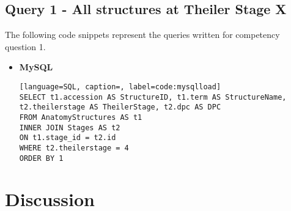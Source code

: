 \subsection*{Query 1 - All structures at Theiler Stage X}\label{query1}

The following code snippets represent the queries written for competency question 1.
\begin{itemize}
\item \textbf{MySQL}
\begin{lstlisting}[language=SQL, caption=, label=code:mysqlload]
SELECT t1.accession AS StructureID, t1.term AS StructureName, t2.theilerstage AS TheilerStage, t2.dpc AS DPC
FROM AnatomyStructures AS t1
INNER JOIN Stages AS t2
ON t1.stage_id = t2.id
WHERE t2.theilerstage = 4
ORDER BY 1
\end{lstlisting}
\end{itemize}
\parindent 15pt
\section{Discussion}\label{discussion}
